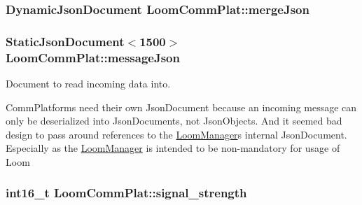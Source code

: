 \subsubsection[{\texorpdfstring{merge\+Json}{mergeJson}}]{\setlength{\rightskip}{0pt plus 5cm}Dynamic\+Json\+Document Loom\+Comm\+Plat\+::merge\+Json\hspace{0.3cm}{\ttfamily [protected]}}\hypertarget{class_loom_comm_plat_a9dbf2f13eafb03ae9078e10af47ca8cf}{}\label{class_loom_comm_plat_a9dbf2f13eafb03ae9078e10af47ca8cf}
\subsubsection[{\texorpdfstring{message\+Json}{messageJson}}]{\setlength{\rightskip}{0pt plus 5cm}Static\+Json\+Document$<$1500$>$ Loom\+Comm\+Plat\+::message\+Json\hspace{0.3cm}{\ttfamily [protected]}}\hypertarget{class_loom_comm_plat_a065bda8c5f83a087359bda645b51c87e}{}\label{class_loom_comm_plat_a065bda8c5f83a087359bda645b51c87e}


Document to read incoming data into. 

Comm\+Platforms need their own Json\+Document because an incoming message can only be deserialized into Json\+Documents, not Json\+Objects. And it seemed bad design to pass around references to the \hyperlink{class_loom_manager}{Loom\+Manager}\textquotesingle{}s internal Json\+Document. Especially as the \hyperlink{class_loom_manager}{Loom\+Manager} is intended to be non-\/mandatory for usage of Loom 
\subsubsection[{\texorpdfstring{signal\+\_\+strength}{signal_strength}}]{\setlength{\rightskip}{0pt plus 5cm}int16\+\_\+t Loom\+Comm\+Plat\+::signal\+\_\+strength\hspace{0.3cm}{\ttfamily [protected]}}\hypertarget{class_loom_comm_plat_a20b6f639d308b8b2f05cea41597bd6d3}{}\label{class_loom_comm_plat_a20b6f639d308b8b2f05cea41597bd6d3}


